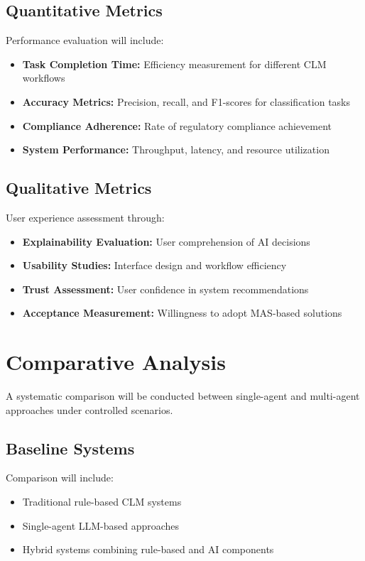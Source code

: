 \subsection{Quantitative Metrics}
Performance evaluation will include:
\begin{itemize}
    \item \textbf{Task Completion Time:} Efficiency measurement for different CLM workflows
    \item \textbf{Accuracy Metrics:} Precision, recall, and F1-scores for classification tasks
    \item \textbf{Compliance Adherence:} Rate of regulatory compliance achievement
    \item \textbf{System Performance:} Throughput, latency, and resource utilization
\end{itemize}

\subsection{Qualitative Metrics}
User experience assessment through:
\begin{itemize}
    \item \textbf{Explainability Evaluation:} User comprehension of AI decisions
    \item \textbf{Usability Studies:} Interface design and workflow efficiency
    \item \textbf{Trust Assessment:} User confidence in system recommendations
    \item \textbf{Acceptance Measurement:} Willingness to adopt MAS-based solutions
\end{itemize}

\section{Comparative Analysis}

A systematic comparison will be conducted between single-agent and multi-agent approaches under controlled scenarios.

\subsection{Baseline Systems}
Comparison will include:
\begin{itemize}
    \item Traditional rule-based CLM systems
    \item Single-agent LLM-based approaches
    \item Hybrid systems combining rule-based and AI components
\end{itemize}

